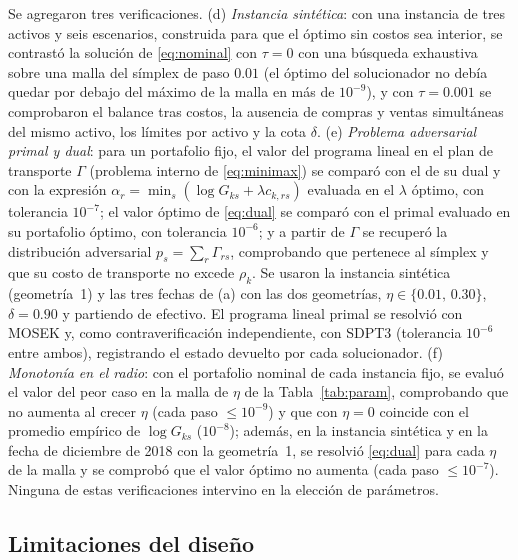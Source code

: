 Se agregaron tres verificaciones. (d) \emph{Instancia sintética}: con una instancia de tres activos y seis escenarios, construida para que el óptimo sin costos sea interior, se contrastó la solución de \eqref{eq:nominal} con $\tau=0$ con una búsqueda exhaustiva sobre una malla del símplex de paso $0.01$ (el óptimo del solucionador no debía quedar por debajo del máximo de la malla en más de $10^{-9}$), y con $\tau=0.001$ se comprobaron el balance tras costos, la ausencia de compras y ventas simultáneas del mismo activo, los límites por activo y la cota $\delta$. (e) \emph{Problema adversarial primal y dual}: para un portafolio fijo, el valor del programa lineal en el plan de transporte $\Gamma$ (problema interno de \eqref{eq:minimax}) se comparó con el de su dual y con la expresión $\alpha_r=\min_s(\log G_{ks}+\lambda c_{k,rs})$ evaluada en el $\lambda$ óptimo, con tolerancia $10^{-7}$; el valor óptimo de \eqref{eq:dual} se comparó con el primal evaluado en su portafolio óptimo, con tolerancia $10^{-6}$; y a partir de $\Gamma$ se recuperó la distribución adversarial $p_s=\sum_r\Gamma_{rs}$, comprobando que pertenece al símplex y que su costo de transporte no excede $\rho_k$. Se usaron la instancia sintética (geometría~1) y las tres fechas de (a) con las dos geometrías, $\eta\in\{0.01,\,0.30\}$, $\delta=0.90$ y partiendo de efectivo. El programa lineal primal se resolvió con MOSEK y, como contraverificación independiente, con SDPT3 (tolerancia $10^{-6}$ entre ambos), registrando el estado devuelto por cada solucionador. (f) \emph{Monotonía en el radio}: con el portafolio nominal de cada instancia fijo, se evaluó el valor del peor caso en la malla de $\eta$ de la Tabla~\ref{tab:param}, comprobando que no aumenta al crecer $\eta$ (cada paso $\le10^{-9}$) y que con $\eta=0$ coincide con el promedio empírico de $\log G_{ks}$ ($10^{-8}$); además, en la instancia sintética y en la fecha de diciembre de 2018 con la geometría~1, se resolvió \eqref{eq:dual} para cada $\eta$ de la malla y se comprobó que el valor óptimo no aumenta (cada paso $\le10^{-7}$). Ninguna de estas verificaciones intervino en la elección de parámetros.

\subsection{Limitaciones del diseño}\label{sec:limit}

